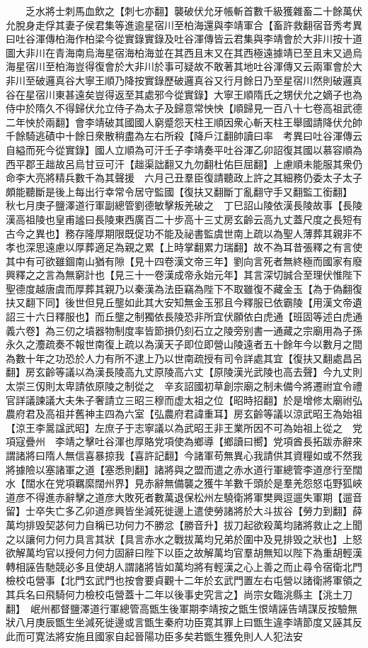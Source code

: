 　　乏水將士刺馬血飲之【刺七亦翻】襲破伏允牙帳斬首數千級獲雜畜二十餘萬伏允脫身走俘其妻子侯君集等進逾星宿川至柏海還與李靖軍合【畜許救翻宿音秀考異曰吐谷渾傳柏海作柏梁今從實錄實錄及吐谷渾傳皆云君集與李靖會於大非川按十道圖大非川在青海南烏海星宿海柏海並在其西且末又在其西極遠據靖已至且末又過烏海星宿川至柏海豈得復會於大非川於事可疑故不敢著其地吐谷渾傳又云兩軍會於大非川至破邏真谷大寧王順乃降按實錄歷破邏真谷又行月餘日乃至星宿川然則破邏真谷在星宿川東甚遠矣豈得返至其處邪今從實錄】大寧王順隋氏之甥伏允之嫡子也為侍中於隋久不得歸伏允立侍子為太子及歸意常怏怏【順歸見一百八十七卷高祖武德二年怏於兩翻】會李靖破其國國人窮蹙怨天柱王順因衆心斬天柱王舉國請降伏允帥千餘騎逃磧中十餘日衆散稍盡為左右所殺【降戶江翻帥讀曰率　考異曰吐谷渾傳云自縊而死今從實錄】國人立順為可汗壬子李靖奏平吐谷渾乙卯詔復其國以慕容順為西平郡王趉故呂烏甘豆可汗【趉渠詘翻又九勿翻杜佑巨屈翻】上慮順未能服其衆仍命李大亮將精兵數千為其聲援　六月己丑羣臣復請聽政上許之其細務仍委太子太子頗能聽斷是後上每出行幸常令居守監國【復扶又翻斷丁亂翻守手又翻監工銜翻】　秋七月庚子鹽澤道行軍副總管劉德敏擊叛羌破之　丁巳詔山陵依漢長陵故事【長陵漢高祖陵也皇甫謐曰長陵東西廣百二十步高十三丈房玄齡云高九丈蓋尺度之長短有古今之異也】務存隆厚期限既促功不能及祕書監虞世南上疏以為聖人薄葬其親非不孝也深思遠慮以厚葬適足為親之累【上時掌翻累力瑞翻】故不為耳昔張釋之有言使其中有可欲雖錮南山猶有隙【見十四卷漢文帝三年】劉向言死者無終極而國家有廢興釋之之言為無窮計也【見三十一卷漢成帝永始元年】其言深切誠合至理伏惟陛下聖德度越唐虞而厚葬其親乃以秦漢為法臣竊為陛下不取雖復不藏金玉【為于偽翻復扶又翻下同】後世但見丘壟如此其大安知無金玉邪且今釋服已依霸陵【用漢文帝遺詔三十六日釋服也】而丘壟之制獨依長陵恐非所宜伏願依白虎通【班固等述白虎通義六卷】為三仞之墳器物制度率皆節損仍刻石立之陵旁别書一通藏之宗廟用為子孫永久之灋疏奏不報世南復上疏以為漢天子即位即營山陵遠者五十餘年今以數月之間為數十年之功恐於人力有所不逮上乃以世南疏授有司令詳處其宜【復扶又翻處昌呂翻】房玄齡等議以為漢長陵高九丈原陵高六丈【原陵漢光武陵也高去聲】今九丈則太崇三仭則太卑請依原陵之制從之　辛亥詔國初草創宗廟之制未備今將遷祔宜令禮官詳議諫議大夫朱子奢請立三昭三穆而虚太祖之位【昭時招翻】於是增修太廟祔弘農府君及高祖并舊神主四為六室【弘農府君諱重耳】房玄齡等議以涼武昭王為始祖【涼王李暠諡武昭】左庶子于志寧議以為武昭王非王業所因不可為始祖上從之　党項寇疊州　李靖之擊吐谷渾也厚賂党項使為鄉導【鄉讀曰嚮】党項酋長拓跋赤辭來謂諸將曰隋人無信喜暴掠我【喜許記翻】今諸軍苟無異心我請供其資糧如或不然我將據險以塞諸軍之道【塞悉則翻】諸將與之盟而遣之赤水道行軍總管李道彦行至闊水【闊水在党項羈縻闊州界】見赤辭無備襲之獲牛羊數千頭於是羣羌怨怒屯野狐峽道彦不得進赤辭擊之道彦大敗死者數萬退保松州左驍衛將軍樊興逗遛失軍期【遛音留】士卒失亡多乙卯道彦興皆坐減死徙邊上遣使勞諸將於大斗拔谷【勞力到翻】薛萬均排毁契苾何力自稱已功何力不勝忿【勝音升】拔刀起欲殺萬均諸將救止之上聞之以讓何力何力具言其狀【具言赤水之戰拔萬均兄弟於圍中及見排毁之狀也】上怒欲解萬均官以授何力何力固辭曰陛下以臣之故解萬均官羣胡無知以陛下為重胡輕漢轉相誣告馳競必多且使胡人謂諸將皆如萬均將有輕漢之心上善之而止尋令宿衛北門檢校屯營事【北門玄武門也按會要貞觀十二年於玄武門置左右屯營以諸衛將軍領之其兵名曰飛騎何力檢校屯營蓋十二年以後事史究言之】尚宗女臨洮縣主【洮土刀翻】　岷州都督鹽澤道行軍總管高甑生後軍期李靖按之甑生恨靖誣告靖謀反按驗無狀八月庚辰甑生坐減死徙邊或言甑生秦府功臣寛其罪上曰甑生違李靖節度又誣其反此而可寛法將安施且國家自起晉陽功臣多矣若甑生獲免則人人犯法安